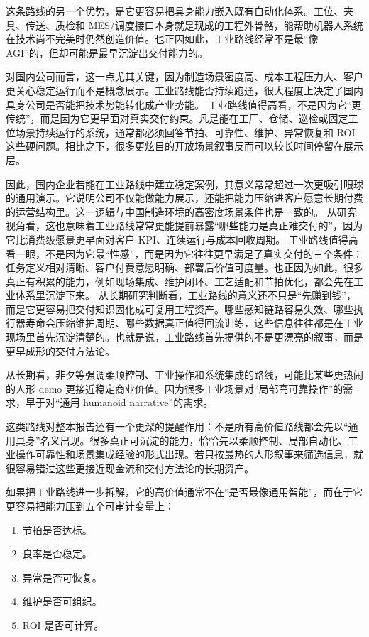 这条路线的另一个优势，是它更容易把具身能力嵌入既有自动化体系。工位、夹具、传送、质检和 MES/调度接口本身就是现成的工程外骨骼，能帮助机器人系统在技术尚不完美时仍然创造价值。也正因如此，工业路线经常不是最“像 AGI”的，但却可能是最早沉淀出交付能力的。

对国内公司而言，这一点尤其关键，因为制造场景密度高、成本工程压力大、客户更关心稳定运行而不是概念展示。工业路线能否持续跑通，很大程度上决定了国内具身公司是否能把技术势能转化成产业势能。 工业路线值得高看，不是因为它“更传统”，而是因为它更早面对真实交付约束。凡是能在工厂、仓储、巡检或固定工位场景持续运行的系统，通常都必须回答节拍、可靠性、维护、异常恢复和 ROI 这些硬问题。相比之下，很多更炫目的开放场景叙事反而可以较长时间停留在展示层。

因此，国内企业若能在工业路线中建立稳定案例，其意义常常超过一次更吸引眼球的通用演示。它说明公司不仅能做能力展示，还能把能力压缩进客户愿意长期付费的运营结构里。这一逻辑与中国制造环境的高密度场景条件也是一致的。 从研究视角看，这也意味着工业路线常常更能提前暴露“哪些能力是真正难交付的”，因为它比消费级愿景更早面对客户 KPI、连续运行与成本回收周期。 工业路线值得高看一眼，不是因为它最“性感”，而是因为它往往更早满足了真实交付的三个条件：任务定义相对清晰、客户付费意愿明确、部署后价值可度量。也正因为如此，很多真正有积累的能力，例如现场集成、维护闭环、工艺适配和节拍优化，都会先在工业体系里沉淀下来。 从长期研究判断看，工业路线的意义还不只是“先赚到钱”，而是它更容易把交付知识固化成可复用工程资产。哪些感知链路容易失效、哪些执行器寿命会压缩维护周期、哪些数据真正值得回流训练，这些信息往往都是在工业现场里首先沉淀清楚的。也就是说，工业路线首先提供的不是更漂亮的叙事，而是更早成形的交付方法论。

从长期看，非夕等强调柔顺控制、工业操作和系统集成的路线，可能比某些更热闹的人形 demo 更接近稳定商业价值。因为很多工业场景对“局部高可靠操作”的需求，早于对“通用 humanoid narrative”的需求。

这类路线对整本报告还有一个更深的提醒作用：不是所有高价值路线都会先以“通用具身”名义出现。很多真正可沉淀的能力，恰恰先以柔顺控制、局部自动化、工业操作可靠性和场景集成经验的形式出现。若只按最热的人形叙事来筛选信息，就很容易错过这些更接近现金流和交付方法论的长期资产。

如果把工业路线进一步拆解，它的高价值通常不在“是否最像通用智能”，而在于它更容易把能力压到五个可审计变量上：

\begin{enumerate}
\item 节拍是否达标。
\item 良率是否稳定。
\item 异常是否可恢复。
\item 维护是否可组织。
\item ROI 是否可计算。
\end{enumerate}

